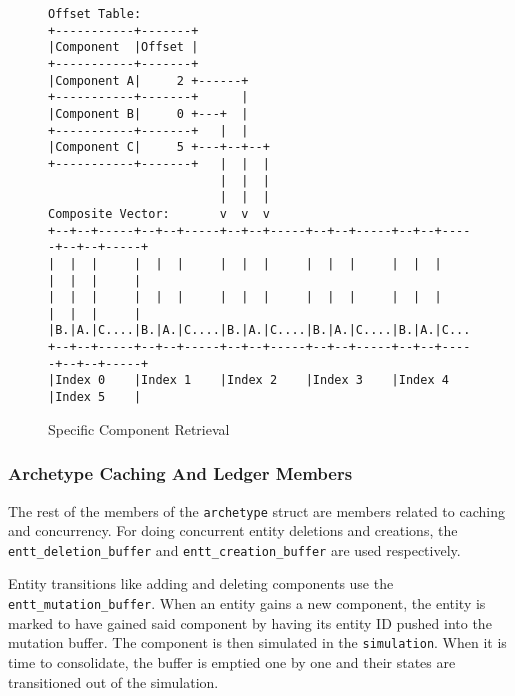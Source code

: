 \begin{figure}[H]
\begin{verbatim}
Offset Table:                                                             
+-----------+-------+                                                     
|Component  |Offset |                                                     
+-----------+-------+                                                     
|Component A|     2 +------+                                              
+-----------+-------+      |                                              
|Component B|     0 +---+  |                                              
+-----------+-------+   |  |                                              
|Component C|     5 +---+--+--+                                           
+-----------+-------+   |  |  |                                           
                        |  |  |                                           
                        |  |  |                                           
Composite Vector:       v  v  v                                           
+--+--+-----+--+--+-----+--+--+-----+--+--+-----+--+--+-----+--+--+-----+ 
|  |  |     |  |  |     |  |  |     |  |  |     |  |  |     |  |  |     | 
|  |  |     |  |  |     |  |  |     |  |  |     |  |  |     |  |  |     | 
|B.|A.|C....|B.|A.|C....|B.|A.|C....|B.|A.|C....|B.|A.|C....|B.|A.|C....| 
+--+--+-----+--+--+-----+--+--+-----+--+--+-----+--+--+-----+--+--+-----+ 
|Index 0    |Index 1    |Index 2    |Index 3    |Index 4    |Index 5    | 
\end{verbatim}
\caption{Specific Component Retrieval}
\label{code:component_retrieval}
\end{figure}

\subsubsection{Archetype Caching And Ledger Members}
The rest of the members of the \texttt{archetype} struct are members related to caching and concurrency. For doing concurrent entity deletions and creations, the \texttt{entt\_deletion\_buffer} and \texttt{entt\_creation\_buffer} are used respectively. 

Entity transitions like adding and deleting components use the \texttt{entt\_mutation\_buffer}. When an entity gains a new component, the entity is marked to have gained said component by having its entity ID pushed into the mutation buffer. The component is then simulated in the \texttt{simulation}. When it is time to consolidate, the buffer is emptied one by one and their states are transitioned out of the simulation. 

